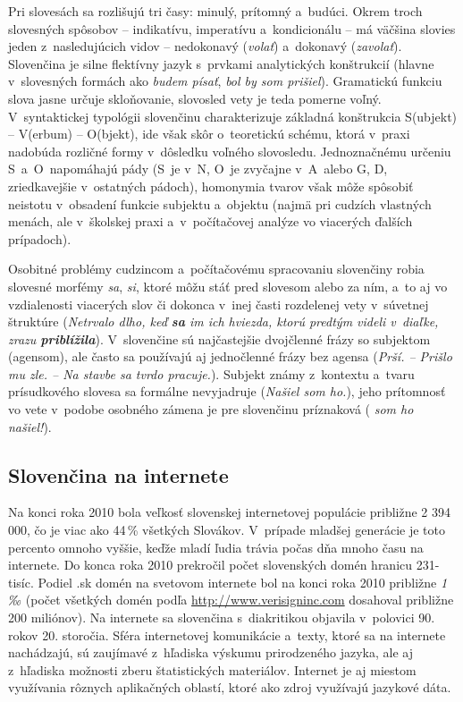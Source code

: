 \begin{multicols}{2}
Pri slovesách sa rozlišujú tri časy: minulý, prítomný a~budúci.
Okrem troch slovesných spôsobov – indikatívu, imperatívu
a~kondicionálu – má väčšina slovies jeden z~nasledujúcich vidov
– nedokonavý (\emph{volať}) a~dokonavý (\emph{zavolať}).
Slovenčina je silne flektívny jazyk s~prvkami analytických
konštrukcií (hlavne v~slovesných formách ako \emph{budem písať},
\emph{bol by som prišiel}). Gramatickú funkciu slova jasne určuje
skloňovanie, slovosled vety je teda pomerne voľný. V~syntaktickej
typológii slovenčinu charakterizuje základná konštrukcia S(ubjekt)
– V(erbum) – O(bjekt), ide však skôr o~teoretickú schému, ktorá
v~praxi nadobúda rozličné formy v~dôsledku voľného slovosledu.
Jednoznačnému určeniu S~a~O~napomáhajú pády (S~je v~N, O~je
zvyčajne v~A~alebo G, D, zriedkavejšie v~ostatných pádoch),
homonymia tvarov však môže spôsobiť neistotu v~obsadení funkcie
subjektu a~objektu (najmä pri cudzích vlastných menách, ale
v~školskej praxi a~v~počítačovej analýze vo viacerých ďalších
prípadoch). 

Osobitné problémy cudzincom a~počítačovému
spracovaniu slovenčiny robia slovesné morfémy
\emph{sa}, \emph{si}, ktoré môžu stáť pred slovesom alebo za ním,
a~to aj vo vzdialenosti viacerých slov či dokonca v~inej časti
rozdelenej vety v~súvetnej štruktúre (\emph{Netrvalo dlho, keď
\textbf{sa} im ich hviezda, ktorú predtým videli v~diaľke, zrazu 
\textbf{priblížila}}). V~slovenčine sú najčastejšie dvojčlenné
frázy so subjektom (agensom), ale často sa používajú aj
jednočlenné frázy bez agensa (\emph{Prší. – Prišlo mu zle. –
Na stavbe sa tvrdo pracuje.}). Subjekt známy z~kontextu a~tvaru
prísudkového slovesa sa formálne nevyjadruje (\emph{Našiel som
ho.}), jeho prítomnosť vo vete v~podobe osobného zámena je pre
slovenčinu príznaková (\emph{ som ho našiel!}).

\subsection{Slovenčina na internete}
Na konci roka 2010 bola veľkosť slovenskej internetovej
populácie približne 2 394 000, čo je viac ako 44\,\% všetkých
Slovákov. V~prípade mladšej generácie je toto percento omnoho
vyššie, keďže mladí ľudia trávia počas dňa mnoho času na
internete. Do konca roka 2010 prekročil počet slovenských domén
hranicu
231-tisíc\cite{f3}.
Podiel .sk domén na svetovom internete bol na konci roka 2010
približne \emph{1\,‰} (počet všetkých domén podľa \url{http://www.verisigninc.com} dosahoval približne 200 miliónov). Na internete sa slovenčina s~diakritikou
objavila v~polovici 90. rokov 20. storočia. Sféra internetovej
komunikácie a~texty, ktoré sa na internete nachádzajú, sú
zaujímavé z~hľadiska výskumu prirodzeného jazyka, ale aj
z~hľadiska možnosti zberu štatistických materiálov. Internet je aj
miestom využívania rôznych aplikačných oblastí, ktoré ako zdroj
využívajú jazykové dáta. 


\end{multicols}
